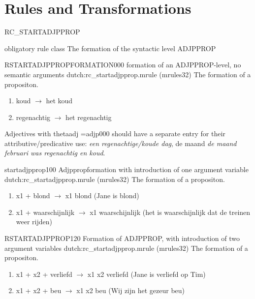 \section{Rules and Transformations}
\begin{mruleclass}{RC\_STARTADJPPROP}
\begin{classdescr}
\kind obligatory rule class
\classtask The formation of the syntactic level ADJPPROP

\nofilters

\nospeedrules

\noplannedrules

\norulesnotince

\begin{comments}
\end{comments}
\end{classdescr}

\begin{members}
\begin{member}
 RSTARTADJPPROPFORMATION000
 formation of an ADJPPROP-level, no semantic arguments
\file dutch:rc\_startadjpprop.mrule (mrules32)
\semantics The formation of a propositon.
\example
\mbox{}
\begin{enumerate}
  \item 
 koud $\rightarrow$ het  koud 
  \item
        regenachtig $\rightarrow$ het regenachtig 
\end{enumerate}
\remarks
Adjectives with thetaadj =adjp000  should have a separate entry for their
attributive/predicative use: {\em een regenachtige/koude dag}, de maand 
{\em de maand februari was regenachtig en koud}. 

\end{member}
\begin{member}
 startadjpprop100
 Adjppropformation with introduction of one argument variable
\file dutch:rc\_startadjpprop.mrule (mrules32)
\semantics The formation of a propositon.
\example 

\mbox{}
\begin{enumerate}
  \item 
x1 + blond $\rightarrow$ x1 blond (Jane is blond)
  \item
x1 + waarschijnlijk $\rightarrow$ x1 waarschijnlijk (het is waarschijnlijk  dat 
de treinen weer rijden)
\end{enumerate}
\remarks

\end{member}
\begin{member}
 RSTARTADJPPROP120
 Formation of ADJPPROP, with introduction of two argument 
variables
\file dutch:rc\_startadjpprop.mrule (mrules32)
\semantics The formation of a propositon.
\example 
\mbox{}
\begin{enumerate}
  \item 
x1 + x2 + verliefd $\rightarrow$ x1 x2 verliefd  (Jane is verliefd op Tim)
  \item
x1 + x2 + beu $\rightarrow$ x1 x2 beu (Wij zijn het gezeur beu) 
\end{enumerate}


\end{member}
\end{members}
\end{mruleclass}
